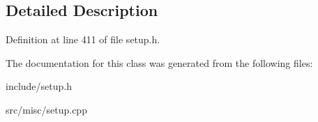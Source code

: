 \subsection{Detailed Description}


Definition at line 411 of file setup.\-h.



The documentation for this class was generated from the following files\-:\begin{DoxyCompactItemize}
\item 
include/setup.\-h\item 
src/misc/setup.\-cpp\end{DoxyCompactItemize}
